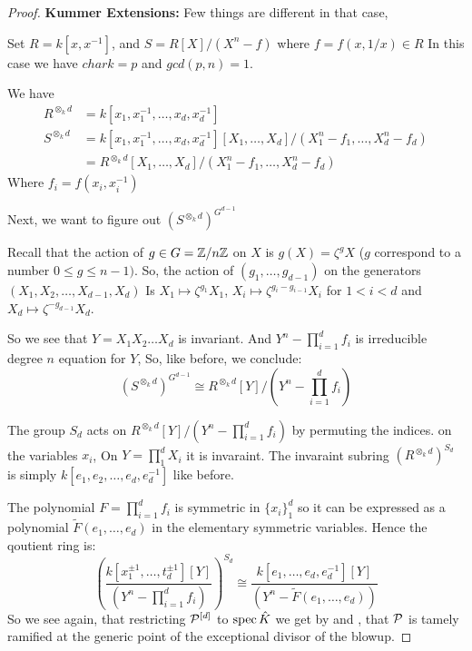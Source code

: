 \begin{proof}
\textbf{Kummer Extensions:}
Few things are different in that case,

     Set $R=k[x, x^{-1}]$, and $S=R[X]/(X^n - f)$ where $f= f(x, 1/x) \in R$
     In this case we have $char k = p$ and $gcd(p, n)=1$.

     We have 
     $$
          \begin{aligned}
          R^{\otimes_k d} &= k[x_1, x_1^{-1}, \dots, x_d, x_d^{-1}] \\
          S^{\otimes_k d} &= k[x_1, x_1^{-1}, \dots, x_d, x_d^{-1}][X_1, \dots, X_d] / (X_1^n - f_1, \dots, X_d^n - f_d) \\
          &= R^{\otimes_k d}[X_1, \dots, X_d] / (X_1^n - f_1, \dots, X_d^n - f_d)
          \end{aligned}
     $$
     Where $f_i = f(x_i, x_i^{-1})$

     Next, we want to figure out 
      $\left(S^{\otimes_k d}\right)^{G^{d-1}}$
    

     Recall that the action of $g \in G=\mathbb{Z}/n\mathbb{Z}$ on $X$ is $g(X) = \zeta^{g} X$ ($g$ correspond to a number $0 \leq g \leq n-1)$.
     So, the action of $(g_1, \dots, g_{d-1})$ on the generators $(X_1, X_2, \dots, X_{d-1}, X_{d})$
     Is $X_1 \mapsto \zeta^{g_1} X_1$, $X_i \mapsto \zeta^{g_i - g_{i-1}}X_i$ for $1<i<d$ and $X_d \mapsto \zeta^{-g_{d-1}} X_d$.

     So we see that $Y=X_1 X_2 \dots X_d$ is invariant.
     And $Y^n - \prod_{i=1}^d f_i$ is irreducible degree $n$ equation for $Y$,
     So, like before, we conclude:
     \[
          \left(S^{\otimes_k d}\right)^{G^{d-1}} \cong R^{\otimes_k d}[Y] / (Y^n - \prod_{i=1}^d f_i)
     \]  
     
     The group $S_d$ acts on $R^{\otimes_k d}[Y] / (Y^n - \prod_{i=1}^d f_i)$ by permuting the indices.
     on the variables $x_i$, 
     On $Y=\prod_1^d X_i$ it is invaraint. 
     The invaraint subring $(R^{\otimes_k d})^{S_d}$ is simply $k[e_1, e_2, \dots, e_d, e_d^{-1}]$ like before.
     

     The polynomial $F=\prod_{i=1}^d f_i$ is symmetric in $\{x_i\}_1^d$ so it can be expressed as a polynomial
     $\tilde{F}(e_1, \dots, e_d)$ in the elementary symmetric variables. 
     Hence the qoutient ring is:
     $$\left( \frac{k[x_1^{\pm 1}, \dots, t_d^{\pm 1}][Y]}{(Y^n - \prod_{i=1}^d f_i)} \right)^{S_d} \cong 
     \frac{k[e_1, \dots, e_d, e_d^{-1}][Y]}{(Y^n - \tilde{F}(e_1, \dots, e_d))}$$
     So we see again, that  restricting $\mathcal{P}^{[d]}$ to $\operatorname{spec} {\hat{K}}$ we get by  
     and , that $\mathcal{P}$ is tamely ramified at the generic point of the exceptional divisor of the blowup.
\end{proof}

